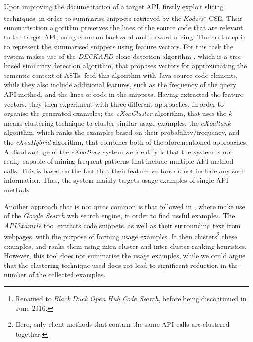 Upon improving the documentation of a target API,  \cite{Kim:2009, Κim:2010, Kim:2013} firstly exploit slicing techniques, in order to summarise snippets retrieved by the \textit{Koders}\footnote{Renamed to \textit{Black Duck Open Hub Code Search}, before being discontinued in June 2016.} CSE. Their summarisation algorithm preserves the lines of the source code that are relevant to the target API, using common backward and forward slicing. The next step is to represent the summarised snippets using feature vectors. For this task the system makes use of the \textit{DECKARD} clone detection algorithm \cite{Jiang:2007}, which is a tree-based similarity detection algorithm, that proposes vectors for approximating the semantic context of ASTs.  feed this algorithm with Java source code elements, while they also include additional features, such as the frequency of the query API method, and the lines of code in the snippets. Having extracted the feature vectors, they then experiment with three different approaches, in order to organise the generated examples; the \textit{eXoaCluster} algorithm, that uses the $k$-means clustering technique to cluster similar usage examples, the \textit{eXoaRank} algorithm, which ranks the examples based on their probability/frequency, and the \textit{eXoaHybrid} algorithm, that combines both of the aforementioned approaches. A disadvantage of the \textit{eXoaDocs} system we identify is that the system is not really capable of mining frequent patterns that include multiple API method calls. This is based on the fact that their feature vectors do not include any such information. Thus, the system mainly targets usage examples of single API methods.

Another approach that is not quite common is that followed in \cite{Wang:2011}, where  make use of the \textit{Google Search} web search engine, in order to find useful examples. The \textit{APIExample} tool extracts code snippets, as well as their surrounding text from webpages, with the purpose of forming usage examples. It then clusters\footnote{Here, only client methods that contain the same API calls are clustered together.} these examples, and ranks them using intra-cluster and inter-cluster ranking heuristics. However, this tool does not summarise the usage examples, while we could argue that the clustering technique used does not lead to significant reduction in the number of the collected examples.

